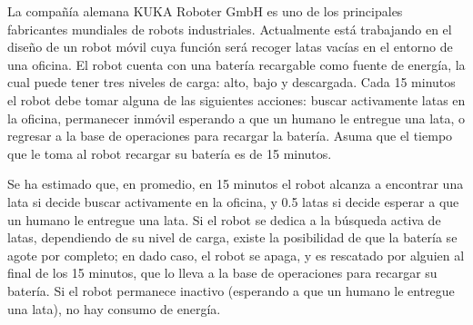 \noindent La compañía alemana KUKA Roboter GmbH es uno de los principales fabricantes mundiales de robots industriales. Actualmente está trabajando en el diseño de un robot móvil cuya función será recoger latas vacías en el entorno de una oficina. El robot cuenta con una batería recargable como fuente de energía, la cual puede tener tres niveles de carga: alto, bajo y descargada. Cada 15 minutos el robot debe tomar alguna de las siguientes acciones: buscar activamente latas en la oficina, permanecer inmóvil esperando a que un humano le entregue una lata, o regresar a la base de operaciones para recargar la batería. Asuma que el tiempo que le toma al robot recargar su batería es de 15 minutos. 

\noindent Se ha estimado que, en promedio, en 15 minutos el robot alcanza a encontrar una lata si decide buscar activamente en la oficina, y 0.5 latas si decide esperar a que un humano le entregue una lata. Si el robot se dedica a la búsqueda activa de latas, dependiendo de su nivel de carga,  existe la posibilidad de que la batería se agote por completo; en dado caso, el robot se apaga, y es rescatado por alguien al final de los 15 minutos, que lo lleva a la base de operaciones para recargar su batería. Si el robot permanece inactivo (esperando a que un humano le entregue una lata), no hay consumo de energía. 

